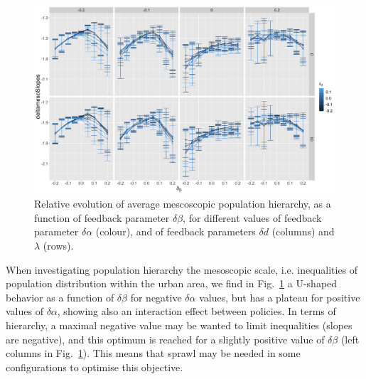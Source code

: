\documentclass[ijgi,article,submit,moreauthors,pdftex]{Definitions/mdpi}
\begin{document}
\begin{figure}[H]
	\includegraphics[width=\textwidth]{figures/deltamesoSlopes-macroMesoAlphaUpdateMax_colormacroMesoBetaUpdateMax_facetmesoMacroCongestionCost-mesoMacroDecayUpdateMax_mesoBeta0_11.png}
	\caption{Relative evolution of average mescoscopic population hierarchy, as a function of feedback parameter $\delta \beta$, for different values of feedback parameter $\delta \alpha$ (colour), and of feedback parameters $\delta d$ (columns) and $\lambda$ (rows).\label{fig:fig6}}
\end{figure}

When investigating population hierarchy the mesoscopic scale, i.e. inequalities of population distribution within the urban area, we find in Fig.~\ref{fig:fig6} a U-shaped behavior as a function of $\delta \beta$ for negative $\delta \alpha$ values, but has a plateau for positive values of $\delta \alpha$, showing also an interaction effect between policies. In terms of hierarchy, a maximal negative value may be wanted to limit inequalities (slopes are negative), and this optimum is reached for a slightly positive value of $\delta \beta$ (left columns in Fig.~\ref{fig:fig6}). This means that sprawl may be needed in some configurations to optimise this objective.
\end{document}
